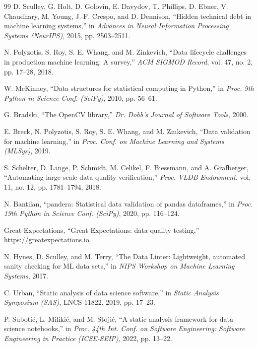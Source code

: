 \begin{thebibliography}{99}
\footnotesize
{}
D. Sculley, G. Holt, D. Golovin, E. Davydov, T. Phillips, D. Ebner, V. Chaudhary, M. Young, J.-F.
Crespo, and D. Dennison, ``Hidden technical debt in machine learning systems,'' in \emph{Advances
in Neural Information Processing Systems (NeurIPS)}, 2015, pp. 2503--2511.

N. Polyzotis, S. Roy, S. E. Whang, and M. Zinkevich, ``Data lifecycle challenges in production
machine learning: A survey,'' \emph{ACM SIGMOD Record}, vol. 47, no. 2, pp. 17--28, 2018.

W. McKinney, ``Data structures for statistical computing in Python,'' in \emph{Proc. 9th Python in
Science Conf. (SciPy)}, 2010, pp. 56--61.

G. Bradski, ``The OpenCV library,'' \emph{Dr. Dobb's Journal of Software Tools}, 2000.

E. Breck, N. Polyzotis, S. Roy, S. E. Whang, and M. Zinkevich, ``Data validation for machine
learning,'' in \emph{Proc. Conf. on Machine Learning and Systems (MLSys)}, 2019.

S. Schelter, D. Lange, P. Schmidt, M. Celikel, F. Biessmann, and A. Grafberger, ``Automating
large-scale data quality verification,'' \emph{Proc. VLDB Endowment}, vol. 11, no. 12,
pp. 1781--1794, 2018.

N. Bantilan, ``pandera: Statistical data validation of pandas dataframes,'' in \emph{Proc. 19th
Python in Science Conf. (SciPy)}, 2020, pp. 116--124.

Great Expectations, ``Great Expectations: data quality testing,'' \url{https://greatexpectations.io}.

N. Hynes, D. Sculley, and M. Terry, ``The Data Linter: Lightweight, automated sanity checking for
ML data sets,'' in \emph{NIPS Workshop on Machine Learning Systems}, 2017.

C. Urban, ``Static analysis of data science software,'' in \emph{Static Analysis Symposium (SAS)},
LNCS 11822, 2019, pp. 17--23.

P. Suboti\'{c}, L. Miliki\'{c}, and M. Stoji\'{c}, ``A static analysis framework for data science
notebooks,'' in \emph{Proc. 44th Int. Conf. on Software Engineering: Software Engineering in
Practice (ICSE-SEIP)}, 2022, pp. 13--22.


\end{thebibliography}
